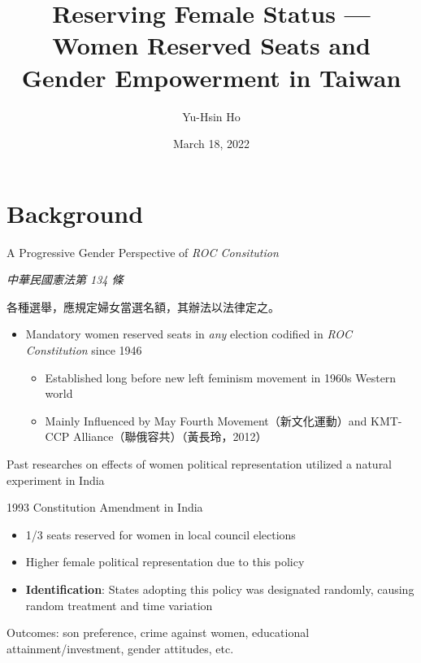 \documentclass[
  9pt,
  ignorenonframetext,
  aspectratio=43,
]{beamer}
\title{Reserving Female Status --- Women Reserved Seats and Gender
Empowerment in Taiwan}
\author{Yu-Hsin Ho}
\date{March 18, 2022}
\institute{Department of Economics, National Taiwan University}
\providecommand{\tightlist}{%
  \setlength{\itemsep}{0pt}\setlength{\parskip}{0pt}}
\renewenvironment{quote}{\begin{customblockquote}\list{}{\rightmargin=0em\leftmargin=0em}%
\item\relax\color{blockquote-text}\ignorespaces}{\unskip\unskip\endlist\end{customblockquote}}
\begin{document}
\frame{\titlepage}

\begin{frame}
  \tableofcontents[hideallsubsections]
\end{frame}
\hypertarget{background}{%
\section{Background}\label{background}}

\begin{frame}{A Progressive Gender Perspective of \emph{ROC
Consitution}}
\protect\hypertarget{a-progressive-gender-perspective-of-roc-consitution}{}
\begin{quote}
\emph{中華民國憲法第 134 條}

各種選舉，應規定婦女當選名額，其辦法以法律定之。
\end{quote}

\begin{itemize}
\tightlist
\item
  Mandatory women reserved seats in \emph{any} election codified in
  \emph{ROC Constitution} since 1946

  \begin{itemize}
  \tightlist
  \item
    Established long before new left feminism movement in 1960s Western
    world
  \item
    Mainly Influenced by May Fourth Movement（新文化運動）and KMT-CCP
    Alliance（聯俄容共）（黃長玲，2012）
  \end{itemize}
\end{itemize}
\end{frame}

\begin{frame}
Past researches on effects of women political representation utilized a
natural experiment in India

\begin{block}{1993 Constitution Amendment in India}
\protect\hypertarget{constitution-amendment-in-india}{}
\begin{itemize}
\tightlist
\item
  1/3 seats reserved for women in local council elections
\item
  Higher female political representation due to this policy
\item
  \textbf{Identification}: States adopting this policy was designated
  randomly, causing random treatment and time variation
\end{itemize}

Outcomes: son preference, crime against women, educational
attainment/investment, gender attitudes, etc.
\end{block}
\end{frame}
\end{document}

